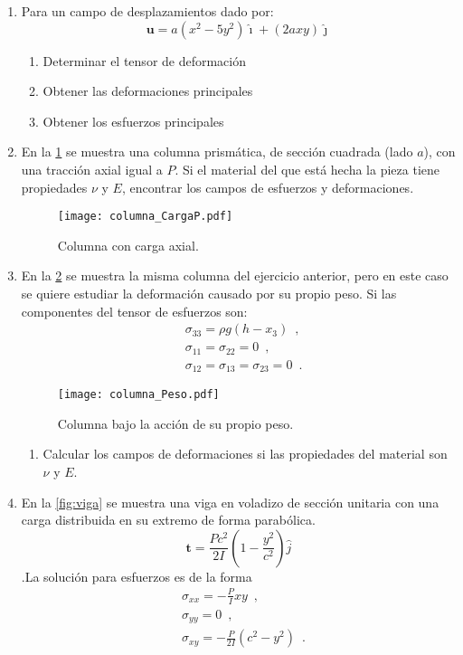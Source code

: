 \documentclass[../notas medios.tex]{subfiles}
\begin{document}
\begin{enumerate}

\item \label{punto01_m} Para un campo de desplazamientos dado por:
\[\mathbf{u} = a(x^2 - 5y^2)\hat{\imath} + (2ax y)\hat{\jmath} \]

\begin{enumerate}
\item Determinar el tensor de deformación
\item Obtener las deformaciones principales
\item Obtener los esfuerzos principales
\end{enumerate}

\item \label{punto02_m}  En la  \cref{columna_CargaP} se muestra una columna prismática, de sección cuadrada (lado $a$), con una tracción axial igual a $P$. Si el material del que está hecha la pieza tiene propiedades $\nu$ y $E$, encontrar los campos de esfuerzos y deformaciones.
\begin{figure}[H]
	\centering
	\texttt{[image: columna\_CargaP.pdf]}
	\caption{Columna con carga axial.}
	\label{columna_CargaP}
\end{figure}

\item \label{punto03_m} En la \cref{fig:columna_g} se muestra la misma columna  del ejercicio anterior, pero en este caso se quiere estudiar la deformación causado por su propio peso. Si las componentes del tensor de esfuerzos son:
\begin{align*}
&\sigma_{33} = \rho g(h- x_{3}) \enspace ,\\
&\sigma_{11} = \sigma_{22} = 0 \enspace ,\\
&\sigma_{12} = \sigma_{13} = \sigma_{23} = 0 \enspace .
\end{align*}

\begin{figure}[h]
	\centering
	\texttt{[image: columna\_Peso.pdf]}
	\caption{Columna bajo la acción de su propio peso.}
	\label{fig:columna_g}
\end{figure}

\begin{enumerate}
\item Calcular los campos de deformaciones si las propiedades del material son $\nu$ y $E$.
\end{enumerate}


\item \label{punto04_m} En la \cref{fig:viga} se muestra una viga en voladizo de sección unitaria con una carga distribuida en su extremo de forma parabólica.
\[\mathbf{t} = \frac{Pc^2}{2I}\left(1 - \frac{y^2}{c^2}\right)\hat{j}\].La 
solución para esfuerzos es de la forma
\begin{align*}
&\sigma_{xx} = -\frac{P}{I}xy \enspace ,\\
&\sigma_{yy} = 0 \enspace ,\\
&\sigma_{xy} = -\frac{P}{2I}(c^2 - y^2) \enspace .
\end{align*}


\end{enumerate}
\end{document}
